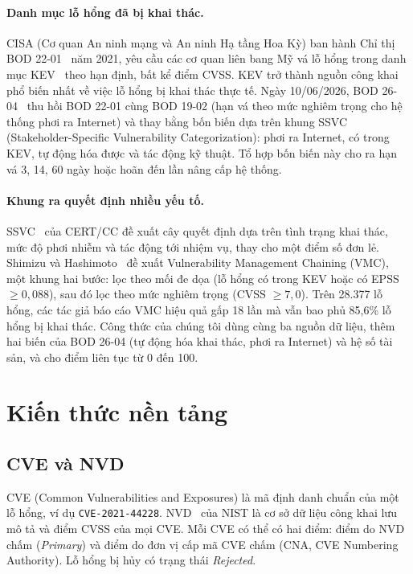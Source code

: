 \documentclass[runningheads]{llncs}
\begin{document}
\paragraph{Danh mục lỗ hổng đã bị khai thác.}
CISA (Cơ quan An ninh mạng và An ninh Hạ tầng Hoa Kỳ) ban hành Chỉ thị BOD 22-01~\cite{bod2201} năm 2021, yêu cầu các cơ quan liên bang Mỹ
vá lỗ hổng trong danh mục KEV~\cite{kev} theo hạn định, bất kể điểm CVSS. KEV trở thành nguồn công khai phổ biến nhất về việc lỗ hổng bị khai thác thực tế. Ngày 10/06/2026, BOD 26-04~\cite{bod2604} thu hồi BOD 22-01 cùng BOD 19-02 (hạn vá theo mức nghiêm trọng cho hệ thống phơi ra Internet) và thay bằng bốn biến dựa trên khung SSVC (Stakeholder-Specific Vulnerability Categorization): phơi ra Internet, có trong KEV, tự động hóa được và tác động kỹ thuật. Tổ hợp bốn biến này cho ra hạn vá 3, 14, 60 ngày hoặc hoãn đến lần nâng cấp hệ thống.

\paragraph{Khung ra quyết định nhiều yếu tố.}
SSVC~\cite{ssvc} của CERT/CC đề xuất cây quyết định dựa trên tình trạng khai thác, mức
độ phơi nhiễm và tác động tới nhiệm vụ, thay cho một điểm số đơn lẻ. Shimizu và
Hashimoto~\cite{shimizu2026} đề xuất Vulnerability Management Chaining (VMC), một khung hai
bước: lọc theo mối đe dọa (lỗ hổng có trong KEV hoặc có EPSS $\ge 0{,}088$), sau đó lọc theo
mức nghiêm trọng (CVSS $\ge 7{,}0$). Trên 28.377 lỗ hổng, các tác giả báo cáo VMC hiệu quả gấp
18 lần mà vẫn bao phủ 85,6\% lỗ hổng bị khai thác. Công thức của chúng tôi dùng cùng ba nguồn dữ liệu, thêm hai biến của BOD 26-04 (tự động hóa khai thác, phơi ra Internet) và hệ số tài sản, và cho điểm liên tục từ 0 đến 100.

\section{Kiến thức nền tảng}\label{sec:nentang}

\subsection{CVE và NVD}
CVE (Common Vulnerabilities and Exposures) là mã định danh chuẩn của một lỗ hổng, ví dụ
\texttt{CVE-2021-44228}. NVD~\cite{nvd} của NIST là cơ sở dữ liệu công khai lưu mô tả và
điểm CVSS của mọi CVE. Mỗi CVE có thể có hai điểm: điểm do NVD chấm (\emph{Primary}) và điểm
do đơn vị cấp mã CVE chấm (CNA, CVE Numbering Authority). Lỗ hổng bị hủy có trạng thái \emph{Rejected}.
\end{document}
